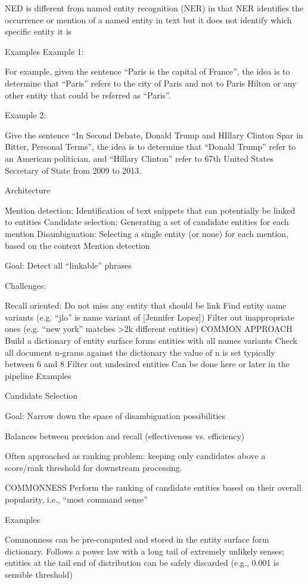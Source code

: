 NED is different from named entity recognition (NER) in that NER identifies the occurrence or mention of a named entity in text but it does not identify which specific entity it is

Examples
Example 1:

For example, given the sentence “Paris is the capital of France”, the idea is to determine that “Paris” refers to the city of Paris and not to Paris Hilton or any other entity that could be referred as “Paris”.


Example 2:

Give the sentence “In Second Debate, Donald Trump and HIllary Clinton Spar in Bitter, Personal Terms”, the idea is to determine that “Donald Trump” refer to an American politician, and “Hillary Clinton” refer to 67th United States Secretary of State from 2009 to 2013.


Architecture


Mention detection: Identification of text snippets that can potentially be linked to entities
Candidate selection: Generating a set of candidate entities for each mention
Disambiguation: Selecting a single entity (or none) for each mention, based on the context
Mention detection


Goal: Detect all “linkable” phrases

Challenges:

Recall oriented: Do not miss any entity that should be link
Find entity name variants (e.g. “jlo” is name variant of [Jennifer Lopez])
Filter out inappropriate ones (e.g. “new york” matches >2k different entities)
COMMON APPROACH
Build a dictionary of entity surface forms
entities with all names variants
Check all document n-grams against the dictionary
the value of n is set typically between 6 and 8
Filter out undesired entities
Can be done here or later in the pipeline
Examples


Candidate Selection


Goal: Narrow down the space of disambiguation possibilities

Balances between precision and recall (effectiveness vs. efficiency)

Often approached as ranking problem: keeping only candidates above a score/rank threshold for downstream processing.

COMMONNESS
Perform the ranking of candidate entities based on their overall popularity, i.e., “most command sense”


Examples


Commonness can be pre-computed and stored in the entity surface form dictionary. Follows a power law with a long tail of extremely unlikely senses; entities at the tail end of distribution can be safely discarded (e.g., 0.001 is sensible threshold)



